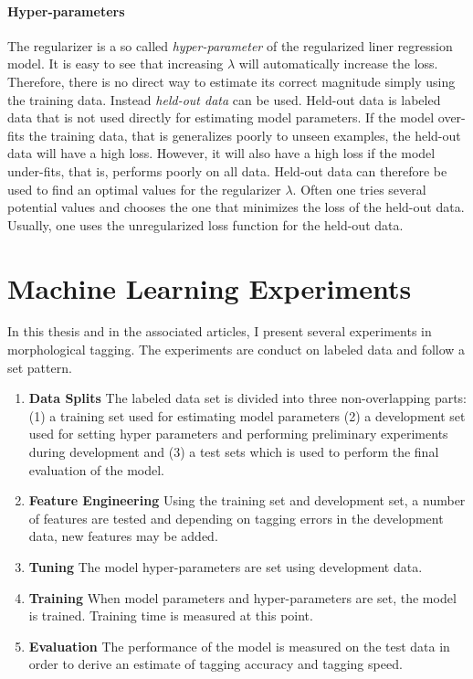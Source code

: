 \paragraph{Hyper-parameters} The regularizer is a so called {\it hyper-parameter} of the
regularized liner regression model. It is easy to see that increasing
$\lambda$ will automatically increase the loss. Therefore, there is no
direct way to estimate its correct magnitude simply using the training
data. Instead {\it held-out data} can be used. Held-out data is
labeled data that is not used directly for estimating model
parameters. If the model over-fits the training data, that is
generalizes poorly to unseen examples, the held-out data will have a
high loss. However, it will also have a high loss if the model
under-fits, that is, performs poorly on all data. Held-out data can
therefore be used to find an optimal values for the regularizer
$\lambda$. Often one tries several potential values and chooses the
one that minimizes the loss of the held-out data. Usually, one uses
the unregularized loss function for the held-out data.

\section{Machine Learning Experiments}

In this thesis and in the associated articles, I present several
experiments in morphological tagging. The experiments are conduct on
labeled data and follow a set pattern.

\begin{enumerate}
\item {\bf Data Splits} The labeled data set is divided into
  three non-overlapping parts: (1) a training set used for estimating
  model parameters (2) a development set used for setting hyper
  parameters and performing preliminary experiments during development
  and (3) a test sets which is used to perform the final evaluation of
  the model.
\item {\bf Feature Engineering} Using the training set and development
  set, a number of features are tested and depending on tagging errors
  in the development data, new features may be added.
\item {\bf Tuning} The model hyper-parameters are set using
  development data.
\item {\bf Training} When model parameters and hyper-parameters are
  set, the model is trained. Training time is measured at this point.
\item {\bf Evaluation} The performance of the model is measured on the
  test data in order to derive an estimate of tagging accuracy and
  tagging speed.
\end{enumerate}

